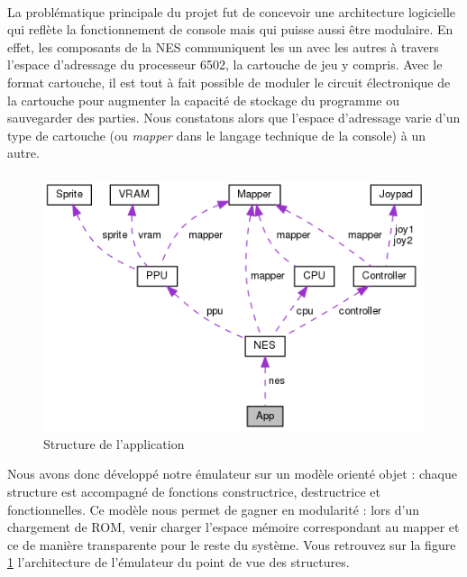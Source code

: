 \paragraph{}
La problématique principale du projet fut de concevoir une architecture logicielle qui reflète la fonctionnement de console mais qui puisse aussi être modulaire. En effet, les composants de la NES communiquent les un avec les autres à travers l'espace d'adressage du processeur 6502, la cartouche de jeu y compris. Avec le format cartouche, il est tout à fait possible de moduler le circuit électronique de la cartouche pour augmenter la capacité de stockage du programme ou sauvegarder des parties. Nous constatons alors que l'espace d'adressage varie d'un type de cartouche (ou \emph{mapper} dans le langage technique de la console) à un autre.

\paragraph{}
\begin{figure}
  \centering
  \includegraphics[width=1\linewidth]{images/struct_app}
  \caption{Structure de l'application}
  \label{fig:struct_app}
\end{figure}
Nous avons donc développé notre émulateur sur un modèle orienté objet : chaque structure est accompagné de fonctions constructrice, destructrice et fonctionnelles. Ce modèle nous permet de gagner en modularité : lors d'un chargement de ROM, venir charger l'espace mémoire correspondant au mapper et ce de manière transparente pour le reste du système. Vous retrouvez sur la figure \ref{fig:struct_app} l'architecture de l'émulateur du point de vue des structures.
